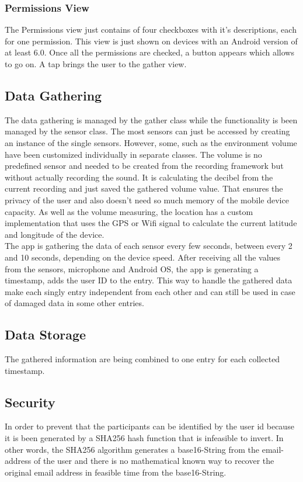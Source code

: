 \subsubsection{Permissions View}
The Permissions view just contains of four checkboxes with it's descriptions, each for one permission. This view is just shown on devices with an Android version of at least 6.0. 
Once all the permissions are checked, a button appears which allows to go on. A tap brings the user to the gather view.

\subsection{Data Gathering}
The data gathering is managed by the gather class while the functionality is been managed by the sensor class. The most sensors can just be accessed by creating an instance of the single sensors. However, some, such as the environment volume have been customized individually in separate classes. The volume is no predefined sensor and needed to be created from the recording framework but without actually recording the sound. It is calculating the decibel from the current recording and just saved the gathered volume value. That ensures the privacy of the user and also doesn't need so much memory of the mobile device capacity. 
As well as the volume measuring, the location has a custom implementation that uses the GPS or Wifi signal to calculate the current latitude and longitude of the device. \\
The app is gathering the data of each sensor every few seconds, between every 2 and 10 seconds, depending on the device speed. After receiving all the values from the sensors, microphone and Android OS, the app is generating a timestamp, adds the user ID to the entry.
This way to handle the gathered data make each singly entry independent from each other and can still be used in case of damaged data in some other entries. 

\subsection{Data Storage}
The gathered information are being combined to one entry for each collected timestamp. 

\subsection{Security}
In order to prevent that the participants can be identified by the user id because it is been generated by a SHA256 hash function that is infeasible to invert. In other words, the SHA256 algorithm generates a base16-String from the email-address of the user and there is no mathematical known way to recover the original email address in feasible time from the base16-String. 


